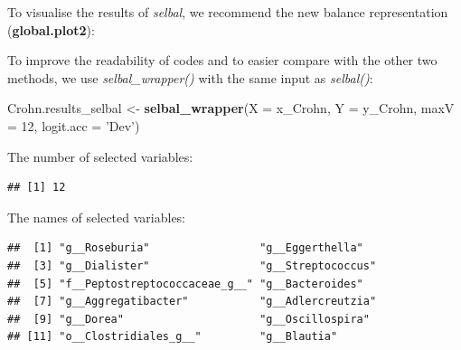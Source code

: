 \documentclass[openany]{book}
\newenvironment{Shaded}{\begin{snugshade}}{\end{snugshade}}
\newcommand{\KeywordTok}[1]{\textcolor[rgb]{0.13,0.29,0.53}{\textbf{#1}}}
\newcommand{\DataTypeTok}[1]{\textcolor[rgb]{0.13,0.29,0.53}{#1}}
\newcommand{\DecValTok}[1]{\textcolor[rgb]{0.00,0.00,0.81}{#1}}
\newcommand{\StringTok}[1]{\textcolor[rgb]{0.31,0.60,0.02}{#1}}
\newcommand{\CommentTok}[1]{\textcolor[rgb]{0.56,0.35,0.01}{\textit{#1}}}
\newcommand{\OperatorTok}[1]{\textcolor[rgb]{0.81,0.36,0.00}{\textbf{#1}}}
\newcommand{\NormalTok}[1]{#1}
\begin{document}
To visualise the results of \emph{selbal}, we recommend the new balance
representation (\textbf{global.plot2}):

\begin{Shaded}
\end{Shaded}

To improve the readability of codes and to easier compare with the other
two methods, we use \emph{selbal\_wrapper()} with the same input as
\emph{selbal()}:

\begin{Shaded}
\begin{Highlighting}[]
\NormalTok{Crohn.results_selbal <-}\StringTok{ }\KeywordTok{selbal_wrapper}\NormalTok{(}\DataTypeTok{X =}\NormalTok{ x_Crohn, }\DataTypeTok{Y =}\NormalTok{ y_Crohn, }
                                       \DataTypeTok{maxV =} \DecValTok{12}\NormalTok{, }\DataTypeTok{logit.acc =} \StringTok{'Dev'}\NormalTok{) }
\end{Highlighting}
\end{Shaded}

The number of selected variables:

\begin{Shaded}
\end{Shaded}

\begin{verbatim}
## [1] 12
\end{verbatim}

The names of selected variables:

\begin{Shaded}
\end{Shaded}

\begin{verbatim}
##  [1] "g__Roseburia"                 "g__Eggerthella"              
##  [3] "g__Dialister"                 "g__Streptococcus"            
##  [5] "f__Peptostreptococcaceae_g__" "g__Bacteroides"              
##  [7] "g__Aggregatibacter"           "g__Adlercreutzia"            
##  [9] "g__Dorea"                     "g__Oscillospira"             
## [11] "o__Clostridiales_g__"         "g__Blautia"
\end{verbatim}
\end{document}
